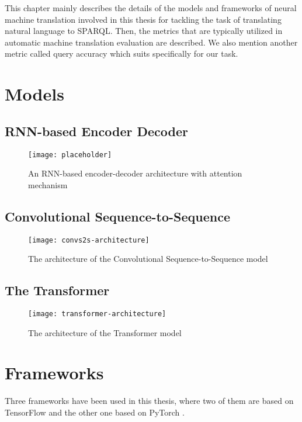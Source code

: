 
This chapter mainly describes the details of the models and frameworks of neural machine translation involved in this thesis for tackling the task of translating natural language to SPARQL. Then, the metrics that are typically utilized in automatic machine translation evaluation are described. We also mention another metric called query accuracy which suits specifically for our task.

\section{Models}

\subsection{RNN-based Encoder Decoder}

\begin{figure}[h]
\texttt{[image: placeholder]}
\centering
\caption{An RNN-based encoder-decoder architecture with attention mechanism}
\label{figure:rnn encoder-decoder}
\end{figure}

\subsection{Convolutional Sequence-to-Sequence}

\begin{figure}[h]
\texttt{[image: convs2s-architecture]}
\centering
\caption{The architecture of the Convolutional Sequence-to-Sequence model}
\label{figure:convs2s model}
\end{figure}

\subsection{The Transformer}

\begin{figure}[h]
\texttt{[image: transformer-architecture]}
\centering
\caption{The architecture of the Transformer model}
\label{figure:transformer model}
\end{figure}




\section{Frameworks}

Three frameworks have been used in this thesis, where two of them are based on TensorFlow \cite{tensorflow2015-whitepaper} and the other one based on PyTorch \cite{paszke2017automatic}.

